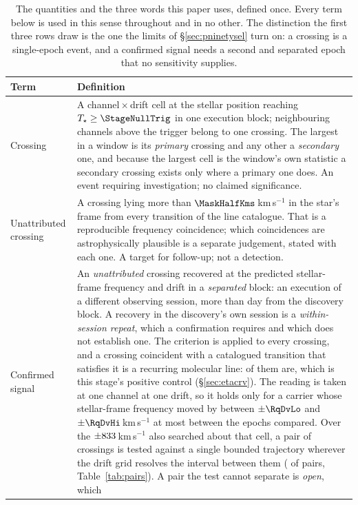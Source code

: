 \begin{table}
\centering
\caption{The quantities and the three words this paper uses, defined once.
Every term below is used in this sense throughout and in no other. The
distinction the first three rows draw is the one the limits of
\S\ref{sec:pninetysel} turn on: a crossing is a single-epoch event, and a
confirmed signal needs a second and separated epoch that no sensitivity
supplies.}
\label{tab:quantities}
\small
\begin{tabular}{@{}p{}p{}@{}}
\hline
Term & Definition \\
\hline
Crossing &
A channel\,$\times$\,drift cell at the stellar position reaching
$T_\star\geq\StageNullTrig$ in one execution block; neighbouring channels
above the trigger belong to one crossing. The largest in a window is its
\emph{primary} crossing and any other a \emph{secondary} one, and because the
largest cell is the window's own statistic a secondary crossing exists only
where a primary one does. An event requiring investigation; no claimed
significance. \\
Unattributed crossing &
A crossing lying more than $\MaskHalfKms$\,km\,s$^{-1}$ in the star's frame
from every transition of the line catalogue. That is a reproducible frequency
coincidence; which coincidences are astrophysically plausible is a separate
judgement, stated with each one. A target for follow-up; not a detection. \\
Confirmed signal &
An \emph{unattributed} crossing recovered at the predicted stellar-frame
frequency and drift in a \emph{separated} block: an execution of a different
observing session, more than \EpSep{} day from the discovery block. A
recovery in the discovery's own session is a \emph{within-session repeat},
which a confirmation requires and which does not establish one. The criterion is
applied to every crossing, and a crossing coincident with a catalogued
transition that satisfies it is a recurring molecular line:
\MkAttrRecur{} of them are, which is this stage's positive control
(\S\ref{sec:etacrv}). The reading is taken at one channel at one drift, so it holds only for a
carrier whose stellar-frame frequency moved by between $\pm\RqDvLo$ and
$\pm\RqDvHi$\,km\,s$^{-1}$ at most between the epochs compared. Over the
$\pm833$\,km\,s$^{-1}$ also searched about that cell, a pair of
crossings is tested against a single bounded trajectory wherever the drift
grid resolves the interval between them (\TjNPower{} of \TjNPair{} pairs,
Table~\ref{tab:pairs}). A pair the test cannot separate is \emph{open}, which

\end{tabular}
\end{table}
